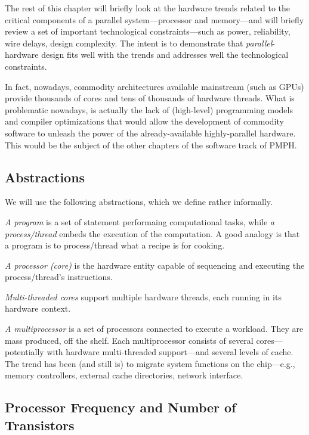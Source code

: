 \documentclass[acmsmall,review]{acmart}\settopmatter{printfolios=true,printccs=false,printacmref=false}
\begin{document}
The rest of this chapter will briefly look at the hardware trends
related to the critical components of a parallel system---processor
and memory---and will briefly review a set of important technological 
constraints---such as power, reliability, wire delays, design 
complexity.   The intent is to demonstrate that \emph{parallel}-hardware 
design fits well with the trends and addresses well the technological 
constraints.

In fact, nowadays, commodity architectures available mainstream (such 
as GPUs) provide thousands of cores and tens of thousands of hardware 
threads.   What is problematic nowadays, is actually the lack of 
(high-level) programming models and compiler optimizations that would 
allow the development of commodity software to unleash the power of
the already-available highly-parallel hardware.   This would be the 
subject of the other chapters of the software track of PMPH.
 
\subsection{Abstractions}

We will use the following abstractions, which we define rather informally.

\emph{A program} is a set of statement performaing computational tasks,
while \emph{a process/thread} embeds the execution of the computation.
A good analogy is that a program is to process/thread what a recipe
is for cooking.

\emph{A processor (core)} is the hardware entity capable of
sequencing and executing the process/thread's instructions.

\emph{Multi-threaded cores} support multiple hardware threads,
each running in its hardware context.

\emph{A multiprocessor} is a set of processors connected to
execute a workload. They are mass produced, off the shelf.
Each multiprocessor consists of several cores---potentially 
with hardware multi-threaded support---and several levels
of cache. The trend has been (and still is) to migrate system 
functions on the chip---e.g., memory controllers, external 
cache directories, network interface.

\subsection{Processor Frequency and Number of Transistors}
\end{document}
